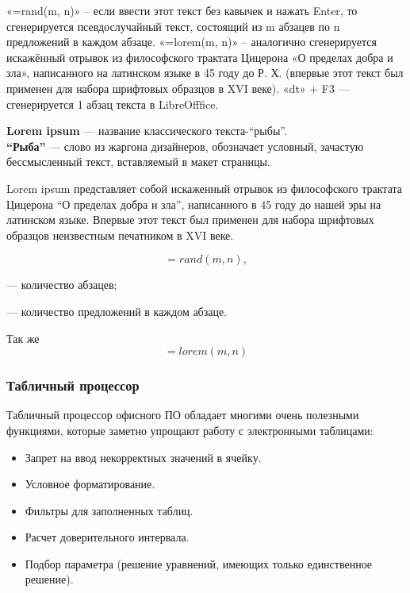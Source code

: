 «=rand(m, n)» – если ввести этот текст без кавычек и нажать Enter, то сгенерируется псевдослучайный
текст, состоящий из m абзацев по n предложений в каждом абзаце.
«=lorem(m, n)» – аналогично сгенерируется искажённый отрывок из философского трактата Цицерона
«О пределах добра и зла», написанного на латинском языке в 45 году до Р. Х. (впервые этот текст был
применен для набора шрифтовых образцов в XVI веке).
«dt» + F3 — сгенерируется 1 абзац текста в LibreOfffice.

\textbf{Lorem ipsum} --- название классического текста-\enquote{рыбы}. \\
\textbf{\enquote{Рыба}} --- слово из жаргона дизайнеров, обозначает условный, зачастую бессмысленный текст, вставляемый в макет страницы.

Lorem ipsum представляет собой искаженный отрывок из философского трактата Цицерона \enquote{О пределах добра и зла}, написанного в 45 году до нашей эры на латинском языке.
Впервые этот текст был применен для набора шрифтовых образцов неизвестным печатником в XVI веке.

\[=rand(m, n),\]
\begin{where}
    \item [$m$] --- количество абзацев;
    \item [$n$] --- количество предложений в каждом абзаце.
\end{where}
Так же
\[=lorem(m, n)\]


\subsubsection{Табличный процессор}\label{subsubsec:spreadsheet}

Табличный процессор офисного ПО обладает многими очень полезными функциями, которые заметно упрощают работу с электронными таблицами:
\begin{itemize}
    \item Запрет на ввод некорректных значений в ячейку.
    \item Условное форматирование.
    \item Фильтры для заполненных таблиц.
    \item Расчет доверительного интервала.
    \item Подбор параметра (решение уравнений, имеющих только единственное решение).
\end{itemize}
